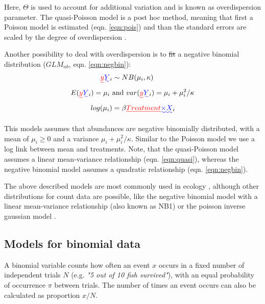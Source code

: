 \documentclass[twocolumn, natbib]{svjour3}
\providecommand{\DIFadd}[1]{{\protect\color{blue}\uwave{#1}}} %
\providecommand{\DIFdel}[1]{{\protect\color{red}\sout{#1}}}                      %
\providecommand{\DIFaddbegin}{} %
\providecommand{\DIFaddend}{} %
\providecommand{\DIFdelbegin}{} %
\providecommand{\DIFdelend}{} %
\begin{document}
Here, \DIFdelbegin \DIFdel{$\Theta$ }\DIFdelend \DIFaddbegin \DIFadd{$\phi$ }\DIFaddend is used to account for additional variation and is known as overdispersion parameter.
The quasi-Poisson model is a post hoc method, meaning that first a Poisson model is estimated (eqn. \ref{eqn:pois}) and than the standard errors are scaled by the degree of overdispersion \DIFaddbegin \citep{hilbe_modeling_2014}\DIFaddend .

Another possibility to deal with overdispersion is to \DIFdelbegin \DIFdel{fit }\DIFdelend \DIFaddbegin \DIFadd{model abundances by }\DIFaddend a negative binomial distribution ($GLM_{nb}$, eqn. \ref{eqn:negbin}):
\begin{align}
  \DIFdelbegin \DIFdel{y}\DIFdelend \DIFaddbegin \DIFadd{Y}\DIFaddend _i &\sim NB(\mu_i, \kappa) \nonumber  \\
  E(\DIFdelbegin \DIFdel{y}\DIFdelend \DIFaddbegin \DIFadd{Y}\DIFaddend _i) = \mu_i ~&\text{and}~var(\DIFdelbegin \DIFdel{y}\DIFdelend \DIFaddbegin \DIFadd{Y}\DIFaddend _i) = \mu_i + \mu_i^2 / \kappa \label{eqn:negbin} \\
  log(\mu_i) &= \beta \DIFdelbegin \DIFdel{Treatment}\DIFdelend \DIFaddbegin \DIFadd{\times X}\DIFaddend _i  \nonumber 
\end{align}

This models assumes that abundances are negative binomially distributed, with a mean of $\mu_i \ge 0$ and a variance $\mu_i + \mu_i^2 / \kappa$.
Similar to the Poisson model we use a log link between mean and treatments.
Note, that the quasi-Poisson model assumes a linear mean-variance relationship (eqn. \ref{eqn:quasi}), whereas the negative binomial model assumes a quadratic relationship (eqn. \ref{eqn:negbin}).

The above described models are most commonly used in ecology \citep{ver_hoef_quasi-poisson_2007}, although other distributions for count data are possible, like the negative binomial model with a linear mean-variance relationship (also known as NB1) or the poisson inverse gaussian model \citep{hilbe_modeling_2014}.


\subsection{Models for binomial data}
\label{ssec:bin}
A binomial variable counts how often an event $x$ occurs in a fixed number of independent trials $N$ (e.g. \emph{"5 out of 10 fish survived"}), with an equal probability of occurrence $\pi$ between trials.
The number of times an event occurs can also be calculated as proportion $x / N$.
\end{document}
